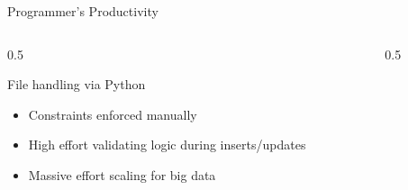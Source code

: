 \documentclass[aspectratio=169, xcolor=dvipsnames]{beamer}
\begin{document}
\begin{frame}{Programmer's Productivity}
    \vspace{-1em}
    \begin{columns}[t]
        \begin{column}{0.5\textwidth}
            \begin{alertblock}{File handling via Python}
                \begin{itemize}[<+->]
                    \item Constraints enforced manually
                    \item High effort validating logic during inserts/updates
                    \item Massive effort scaling for big data
                \end{itemize}
            \end{alertblock}
        \end{column}
        \begin{column}{0.5\textwidth}
        \end{column}
    \end{columns}
\end{frame}
\end{document}
